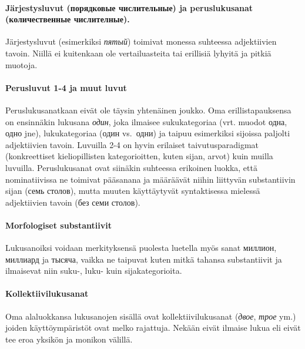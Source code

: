 \documentclass[]{scrartcl}
\begin{document}
\paragraph{Järjestysluvut (порядковые числительные) ja peruslukusanat
(количественные
числителные).}\label{juxe4rjestysluvut-ux43fux43eux440ux44fux434ux43aux43eux432ux44bux435-ux447ux438ux441ux43bux438ux442ux435ux43bux44cux43dux44bux435-ja-peruslukusanat-ux43aux43eux43bux438ux447ux435ux441ux442ux432ux435ux43dux43dux44bux435-ux447ux438ux441ux43bux438ux442ux435ux43bux43dux44bux435.}

Järjestysluvut (esimerkiksi \emph{пятый}) toimivat monessa suhteessa
adjektiivien tavoin. Niillä ei kuitenkaan ole vertailuasteita tai
erillisiä lyhyitä ja pitkiä muotoja.

\paragraph{Perusluvut 1-4 ja muut
luvut}\label{perusluvut-1-4-ja-muut-luvut}

Peruslukusanatkaan eivät ole täysin yhtenäinen joukko. Oma
erillistapauksensa on ensinnäkin lukusana \emph{один}, joka ilmaisee
sukukategoriaa (vrt. muodot одна, одно jne), lukukategoriaa (один
vs.~одни) ja taipuu esimerkiksi sijoissa paljolti adjektiivien tavoin.
Luvuilla 2-4 on hyvin erilaiset taivutusparadigmat (konkreettiset
kieliopillisten kategorioitten, kuten sijan, arvot) kuin muilla
luvuilla. Peruslukusanat ovat siinäkin suhteessa erikoinen luokka, että
nominatiivissa ne toimivat pääsanana ja määräävät niihin liittyvän
substantiivin sijan (семь столов), mutta muuten käyttäytyvät
syntaktisessa mielessä adjektiivien tavoin (без семи столов).

\paragraph{Morfologiset substantiivit}\label{morfologiset-substantiivit}

Lukusanoiksi voidaan merkityksensä puolesta luetella myös sanat миллион,
миллиард ja тысяча, vaikka ne taipuvat kuten mitkä tahansa substantiivit
ja ilmaisevat niin suku-, luku- kuin sijakategorioita.

\paragraph{Kollektiivilukusanat}\label{kollektiivilukusanat}

Oma alaluokkansa lukusanojen sisällä ovat kollektiivilukusanat
(\emph{двое}, \emph{трое} ym.) joiden käyttöympäristöt ovat melko
rajattuja. Nekään eivät ilmaise lukua eli eivät tee eroa yksikön ja
monikon välillä.
\end{document}
